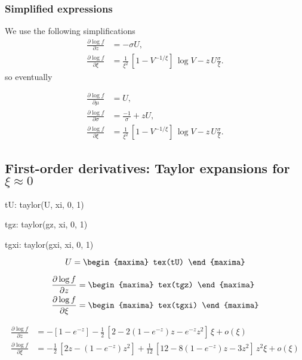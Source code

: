 \subsubsection*{Simplified expressions}

We use the following simplifications
\begin{align*} 
  \frac{\partial \log f}{\partial z}
  &= - \sigma U, %
  \\
  \frac{\partial \log f}{\partial \xi}
  &= \frac{1}{\xi^2} \, [1 - V^{-1/\xi}]  \, \log V - z \, U \frac{\sigma}{\xi}.
\end{align*}
so eventually

{\color{red}
\begin{align*} 
  \frac{\partial \log f}{\partial \mu}
  &= U,
  \\
  \frac{\partial \log f}{\partial \sigma}
  &= \frac{-1}{\sigma} + z U,
  \\
  \frac{\partial \log f}{\partial \xi}
  &= \frac{1}{\xi^2} \, [1 - V^{-1/\xi}]  \, \log V - z \, U \frac{\sigma}{\xi}.
\end{align*}
}

\subsection{First-order derivatives: Taylor expansions for $\xi \approx 0$}
\begin{maxima}
  tU: taylor(U, xi, 0, 1)
\end{maxima}
\begin{maxima}
  tgz: taylor(gz, xi, 0, 1)
\end{maxima}
\begin{maxima}
  tgxi: taylor(gxi, xi, 0, 1)
\end{maxima}
{\color{MonVertF}
$$
U =
\begin{maxima}
  tex(tU)
\end{maxima}
$$
}

{\color{MonVertF}
\begin{align*}
  \frac{\partial \log f}{\partial z} &= 
  \begin{maxima}
    tex(tgz)
  \end{maxima} \\
  \frac{\partial \log f}{\partial \xi} &= 
  \begin{maxima}
    tex(tgxi)
  \end{maxima}
\end{align*}
}

{\color{red}
\begin{align*}
\frac{\partial \log f}{\partial z} &= -\left[ 1 - e^{-z} \right]
- \frac{1}{2}\, \left[2 -2 (1 - e^{-z}) z -  e^{-z} z^2 \right] \, \xi + o(\xi)  \\
\frac{\partial \log f}{\partial \xi} &= -\frac{1}{2}\,\left[ 2 z - (1 - e^{-z}) z^2 \right]
+  \frac{1}{12}\, \left[12 - 8 (1 - e^{-z}) z - 3z^2\right] \, z^2 \xi + o(\xi) 
\end{align*}
}

